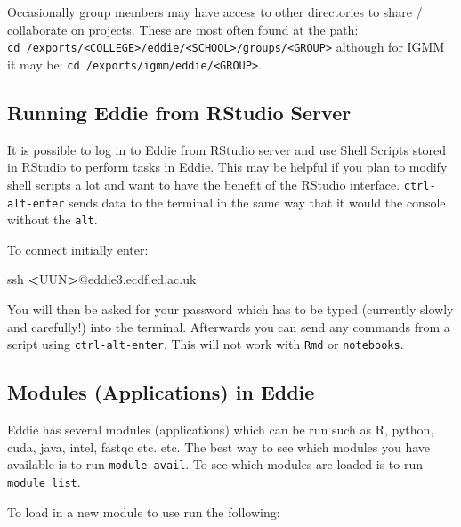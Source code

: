 \documentclass[]{book}
\newenvironment{Shaded}{\begin{snugshade}}{\end{snugshade}}
\newcommand{\FunctionTok}[1]{\textcolor[rgb]{0.00,0.00,0.00}{#1}}
\newcommand{\NormalTok}[1]{#1}
\newcommand{\OperatorTok}[1]{\textcolor[rgb]{0.81,0.36,0.00}{\textbf{#1}}}
\theoremstyle{definition}
\theoremstyle{definition}
\theoremstyle{definition}
\theoremstyle{remark}
\begin{document}
Occasionally group members may have access to other directories to share
/ collaborate on projects. These are most often found at the path:
\texttt{cd\ /exports/\textless{}COLLEGE\textgreater{}/eddie/\textless{}SCHOOL\textgreater{}/groups/\textless{}GROUP\textgreater{}}
although for IGMM it may be:
\texttt{cd\ /exports/igmm/eddie/\textless{}GROUP\textgreater{}}.

\hypertarget{running-eddie-from-rstudio-server}{%
\subsection{Running Eddie from RStudio
Server}\label{running-eddie-from-rstudio-server}}

It is possible to log in to Eddie from RStudio server and use Shell
Scripts stored in RStudio to perform tasks in Eddie. This may be helpful
if you plan to modify shell scripts a lot and want to have the benefit
of the RStudio interface. \texttt{ctrl-alt-enter} sends data to the
terminal in the same way that it would the console without the
\texttt{alt}.

To connect initially enter:

\begin{Shaded}
\begin{Highlighting}[]
\FunctionTok{ssh} \OperatorTok{<}\NormalTok{UUN}\OperatorTok{>}\NormalTok{@eddie3.ecdf.ed.ac.uk}
\end{Highlighting}
\end{Shaded}

You will then be asked for your password which has to be typed
(currently slowly and carefully!) into the terminal. Afterwards you can
send any commands from a script using \texttt{ctrl-alt-enter}. This will
not work with \texttt{Rmd} or \texttt{notebooks}.

\hypertarget{modules-applications-in-eddie}{%
\subsection{Modules (Applications) in
Eddie}\label{modules-applications-in-eddie}}

Eddie has several modules (applications) which can be run such as R,
python, cuda, java, intel, fastqc etc. etc. The best way to see which
modules you have available is to run \texttt{module\ avail}. To see
which modules are loaded is to run \texttt{module\ list}.

To load in a new module to use run the following:
\end{document}

